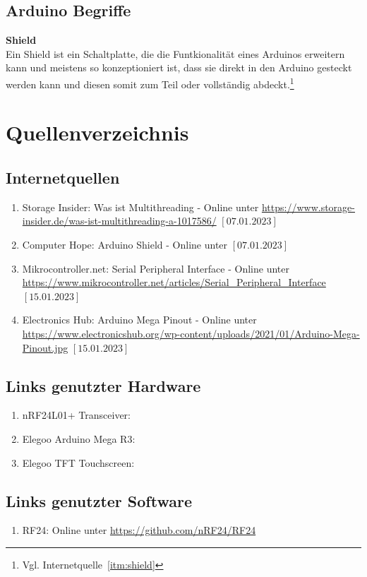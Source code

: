 \documentclass[a4paper, 11pt]{scrartcl}
\begin{document}
\subsection{Arduino Begriffe}
\textbf{Shield\label{def:shield}}
\\
Ein Shield ist ein Schaltplatte, die die Funtkionalität eines Arduinos erweitern kann und meistens so konzeptioniert ist, dass sie direkt in den Arduino gesteckt werden kann und diesen somit
zum Teil oder vollständig abdeckt.\footnote{Vgl. Internetquelle~\ref{itm:shield}}
\newpage
\section{Quellenverzeichnis}
\subsection{Internetquellen}
\begin{enumerate}
    \item Storage Insider: Was ist Multithreading - Online unter \url{https://www.storage-insider.de/was-ist-multithreading-a-1017586/} $\left[\text{07.01.2023}\right]$ \label{itm:multithread}
    \item Computer Hope: Arduino Shield - Online unter \url{} $\left[\text{07.01.2023}\right]$ \label{itm:shield}
    \item Mikrocontroller.net: Serial Peripheral Interface - Online unter \url{https://www.mikrocontroller.net/articles/Serial_Peripheral_Interface} $\left[\text{15.01.2023}\right]$ \label{itm:SPI}
    \item Electronics Hub: Arduino Mega Pinout - Online unter \url{https://www.electronicshub.org/wp-content/uploads/2021/01/Arduino-Mega-Pinout.jpg} $\left[\text{15.01.2023}\right]$ \label{itm:pinout}
\end{enumerate}

\subsection{Links genutzter Hardware}\label{ch:hardwarelinks}
\begin{enumerate}
    \item nRF24L01+ Transceiver: \url{}\label{itm:transceiverlink}
    \item Elegoo Arduino Mega R3: \url{}\label{itm:arduinolink}
    \item Elegoo TFT Touchscreen: \url{}\label{itm:tftlink}
\end{enumerate}

\subsection{Links genutzter Software}\label{ch:softwarelinks}
\begin{enumerate}
    \item RF24: Online unter \url{https://github.com/nRF24/RF24}\label{link:rf24}
\end{enumerate}
\end{document}
